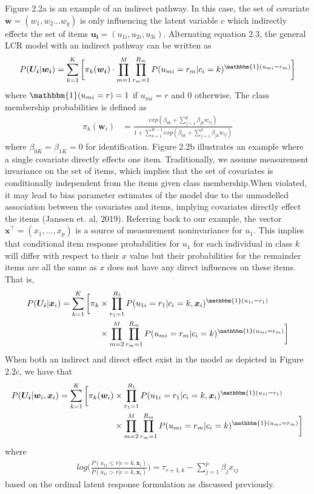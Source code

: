 %
%
Figure 2.2a is an example of an indirect pathway. In this case, the set of covariate $\bm{w}=(w_{1},w_{2}...w_{q})$ is only influencing the latent variable $c$ which indirectly effects the set of items $\bm{u_{i}}=(u_{1i},u_{2i},u_{3i})$. Alternating equation 2.3, the general LCR model with an indirect pathway can be written as 
\begin{align}
P(\bm{U_{i}}|\bm{w_{i}}) = \sum_{k=1}^{K} \bigg[ \pi_{k}(\bm{w_{i}}) \cdot  \prod_{m=1}^{M}\prod_{r_{m}=1}^{R_{m}} P(u_{mi}=r_{m}|c_{i}=k)^{\mathbbm{1}(u_{mi} = r_{m})} \bigg ]
\end{align}
where $\mathbbm{1}(u_{mi} = r)=1$ if $u_{mi}=r$ and $0$ otherwise. The class membership probabilities is defined as 
\begin{align}
    \pi_{k}(\bm{w}_{i}) &=  \frac{exp(\beta_{0k} + \sum_{j=1}^{p}\beta_{jk}w_{ij})}
    {1 + \sum_{h=1}^{K-1}exp(\beta_{0k} + \sum_{j=1}^{p} \beta_{jk}w_{ij})}
\end{align} where $\beta_{0K}=\beta_{1K}=0$ for identification. Figure 2.2b illustrates an example where a single covariate directly effects one item. Traditionally, we assume measurement invariance on the set of items, which implies that the set of covariates is conditionally independent from the items given class membership.When violated, it may lead to bias parameter estimates of the model due to the unmodelled association between the covariates and items, implying covariates directly effect the items (Janssen et. al, 2019). Referring back to our example, the vector $\bm{x}^\intercal=(x_{1},...,x_{p})$ is a source of measurement noninvariance for $u_{1}$. This implies that conditional item response probabilities for $u_{1}$ for each individual in class $k$ will differ with respect to their $x$ value but their probabilities for the remainder items are all the same as $x$ does not have any direct influences on these items. That is, 
\begin{align}
P(\bm{U_{i}}|\bm{x}_{i}) = \sum_{k=1}^{K} \bigg[ \pi_{k} &\times \prod_{r_{1}=1}^{R_{1}}  P(u_{1i}=r_{1}|c_{i}=k,\bm{x}_{i})^{\mathbbm{1}(u_{1i} = r_{1})}  \nonumber \\
 & \times \prod_{m=2}^{M}\prod_{r_{m}=1}^{R_{m}} P(u_{mi}=r_{m}|c_{i}=k)^{\mathbbm{1}(u_{mi} = r_{m})} \bigg ]
\end{align}
When both an indirect and direct effect exist in the model as depicted in Figure 2.2c, we have that 
\begin{align}
P(\bm{U_{i}}|\bm{w}_{i},\bm{x}_{i}) = \sum_{k=1}^{K} \bigg[ \pi_{k}(\bm{w}_{i}) &\times \prod_{r_{1}=1}^{R_{1}}  P(u_{1i}=r_{1}|c_{i}=k,\bm{x}_{i})^{\mathbbm{1}(u_{1i} = r_{1})}  \nonumber \\
 & \times \prod_{m=2}^{M}\prod_{r_{m}=1}^{R_{m}} P(u_{mi}=r_{m}|c_{i}=k)^{\mathbbm{1}(u_{mi} = r_{m})} \bigg]
\end{align} where
\begin{align}
    log\bigg( \frac{P(u_{1i} \leq r|c=k,\bm{x}_{i})}{P(u_{1i} > r|c=k,\bm{x}_{i})}  \bigg) = \tau_{r+1,k} -\sum_{j=1}^{p} \beta_{j}x_{ij} 
\end{align}
based on the ordinal latent response formulation as discussed previously.

